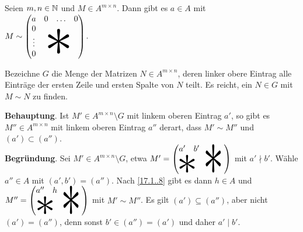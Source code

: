 \documentclass[../../main.tex]{subfiles}
\begin{document}
\begin{lem}\label{17.1.9}
    Seien $m,n\in \mathbb N$ und $M\in A^{m\times n}$. Dann gibt es $a\in A$ mit\\ $M\sim\begin{pmatrix}a&0&\hdots&0\\
        0&&&\\\vdots&&
        \begin{tikzpicture}[overlay]\node[xshift=-0.3em,yshift=0.5em,scale=7]{$*$};\end{tikzpicture}&\\
        0&&&
    \end{pmatrix}$.
\end{lem}
\begin{cproof}
    Bezeichne $G$ die Menge der Matrizen $N\in A^{m\times n}$, deren linker obere Eintrag alle Einträge der ersten Zeile und ersten Spalte von $N$ teilt. Es reicht, ein $N\in G$ mit $M\sim N$ zu finden.\\

    \begin{tcolorbox}[arc=0mm, boxrule=0.2mm]
        \noindent\textbf{Behauptung}. Ist $M'\in A^{m\times n}\setminus G$ mit linkem oberen Eintrag $a'$, so gibt es $M''\in A^{m\times n}$ mit linkem oberen Eintrag $a''$ derart, dass $M'\sim M''$ und $(a')\subset (a'')$.\\

        \noindent\textbf{Begründung}. Sei $M'\in A^{m\times n}\setminus G$, etwa $M'=\begin{pmatrix}a'&b'&&\begin{tikzpicture}[overlay]\node[xshift=-0.3em,yshift=-1em,yscale=8,xscale=5]{$*$};\end{tikzpicture}&\\&&&&\\\begin{tikzpicture}[overlay]\node[xshift=0.6em,yshift=0.8em,scale=5]{$*$};\end{tikzpicture}&&&\end{pmatrix}$ mit $a'\nmid b'$. Wähle $a''\in A$ mit $(a',b')=(a'')$. Nach \ref{17.1..8} gibt es dann $h\in A$ und $M''=\begin{pmatrix}a''&h&&\begin{tikzpicture}[overlay]\node[xshift=-0.3em,yshift=-1em,yscale=8,xscale=5]{$*$};\end{tikzpicture}&\\&&&&\\\begin{tikzpicture}[overlay]\node[xshift=0.6em,yshift=0.8em,scale=5]{$*$};\end{tikzpicture}&&&\end{pmatrix}$ mit $M'\sim M''$. Es gilt $(a')\subseteq (a'')$, aber nicht $(a')=(a'')$, denn sonst $b'\in(a'')=(a')$ und daher $a'\mid b'$.
    \end{tcolorbox}


\end{cproof}
\end{document}
